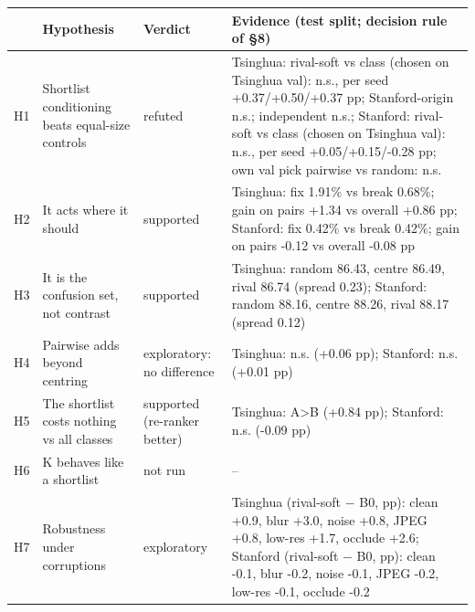 \begin{tabular}{lp{4.2cm}p{2.6cm}p{8.4cm}}
\toprule
& Hypothesis & Verdict & Evidence (test split; decision rule of \S8) \\
\midrule
H1 & Shortlist conditioning beats equal-size controls & refuted & Tsinghua: rival-soft vs class (chosen on Tsinghua val): n.s., per seed +0.37/+0.50/+0.37 pp; Stanford-origin n.s.; independent n.s.; Stanford: rival-soft vs class (chosen on Tsinghua val): n.s., per seed +0.05/+0.15/-0.28 pp; own val pick pairwise vs random: n.s. \\
H2 & It acts where it should & supported & Tsinghua: fix 1.91\% vs break 0.68\%; gain on pairs +1.34 vs overall +0.86 pp; Stanford: fix 0.42\% vs break 0.42\%; gain on pairs -0.12 vs overall -0.08 pp \\
H3 & It is the confusion set, not contrast & supported & Tsinghua: random 86.43, centre 86.49, rival 86.74 (spread 0.23); Stanford: random 88.16, centre 88.26, rival 88.17 (spread 0.12) \\
H4 & Pairwise adds beyond centring & exploratory: no difference & Tsinghua: n.s. (+0.06 pp); Stanford: n.s. (+0.01 pp) \\
H5 & The shortlist costs nothing vs all classes & supported (re-ranker better) & Tsinghua: A>B (+0.84 pp); Stanford: n.s. (-0.09 pp) \\
H6 & K behaves like a shortlist & not run & -- \\
H7 & Robustness under corruptions & exploratory & Tsinghua (rival-soft $-$ B0, pp): clean +0.9, blur +3.0, noise +0.8, JPEG +0.8, low-res +1.7, occlude +2.6; Stanford (rival-soft $-$ B0, pp): clean -0.1, blur -0.2, noise -0.1, JPEG -0.2, low-res -0.1, occlude -0.2 \\
\bottomrule
\end{tabular}
